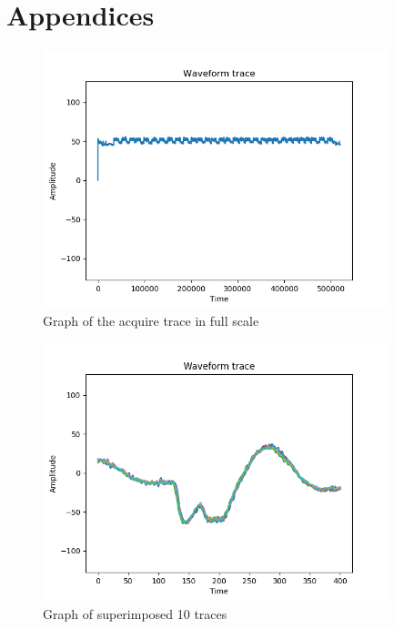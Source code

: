 \documentclass[1p,16pt]{elsarticle}
\begin{document}


% 
% 
%
\newpage
\section{Appendices}%
\label{sec:appendices}


\begin{figure}[hb]
	\centering
    \centerline{\includegraphics[width=10cm]{trace_plot}}
    \caption{Graph of the acquire trace in full scale}\label{fig:acquired_trace}
\end{figure}

\begin{figure}[hb]
	\centering
    \centerline{\includegraphics[width=10cm]{traces_plot}}
    \caption{Graph of superimposed 10 traces}\label{fig:traces_plot}
\end{figure}
\end{document}
